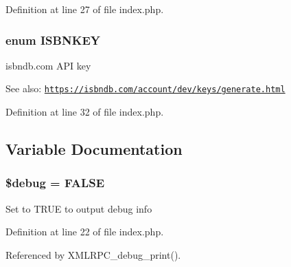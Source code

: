 Definition at line 27 of file index.php.\hypertarget{index_8php_93bb4a6cf53ca9db8d391bc20eee6442}{
\subsubsection{\setlength{\rightskip}{0pt plus 5cm}enum {\bf ISBNKEY}}}
\label{index_8php_93bb4a6cf53ca9db8d391bc20eee6442}


isbndb.com API key \begin{Desc}
\item[See also:]\href{https://isbndb.com/account/dev/keys/generate.html}{\tt https://isbndb.com/account/dev/keys/generate.html} \end{Desc}


Definition at line 32 of file index.php.

\subsection{Variable Documentation}
\hypertarget{index_8php_85ae3e64cd40e9564adceb010085e9dd}{
\subsubsection{\setlength{\rightskip}{0pt plus 5cm}\$debug = FALSE}}
\label{index_8php_85ae3e64cd40e9564adceb010085e9dd}


Set to TRUE to output debug info 

Definition at line 22 of file index.php.

Referenced by XMLRPC\_\-debug\_\-print().